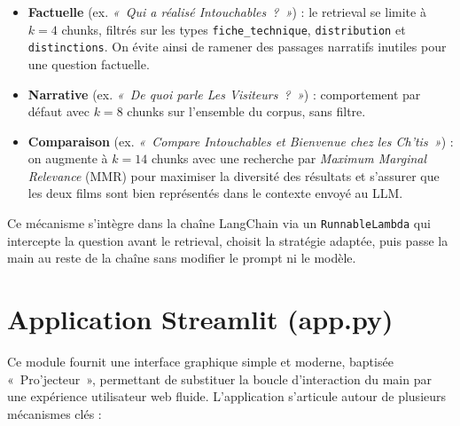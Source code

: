 \documentclass[11pt]{report}
\begin{document}
    \begin{itemize}
        \item \textbf{Factuelle} (ex. \textit{«~Qui a réalisé Intouchables~?~»}) : le retrieval se limite à $k=4$ chunks, filtrés sur les types \texttt{fiche\_technique}, \texttt{distribution} et \texttt{distinctions}. On évite ainsi de ramener des passages narratifs inutiles pour une question factuelle.
        \item \textbf{Narrative} (ex. \textit{«~De quoi parle Les Visiteurs~?~»}) : comportement par défaut avec $k=8$ chunks sur l'ensemble du corpus, sans filtre.
        \item \textbf{Comparaison} (ex. \textit{«~Compare Intouchables et Bienvenue chez les Ch'tis~»}) : on augmente à $k=14$ chunks avec une recherche par \textit{Maximum Marginal Relevance} (MMR) pour maximiser la diversité des résultats et s'assurer que les deux films sont bien représentés dans le contexte envoyé au LLM.
    \end{itemize}

    Ce mécanisme s'intègre dans la chaîne LangChain via un \texttt{RunnableLambda} qui intercepte la question avant le retrieval, choisit la stratégie adaptée, puis passe la main au reste de la chaîne sans modifier le prompt ni le modèle.

    \section{Application Streamlit (app.py)}
    Ce module fournit une interface graphique simple et moderne, baptisée «~Pro'jecteur~», permettant de substituer la boucle d'interaction du main par une expérience utilisateur web fluide.
    L'application s'articule autour de plusieurs mécanismes clés :
\end{document}
